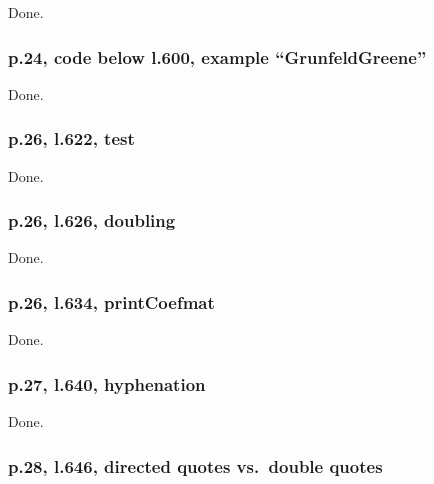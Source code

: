 \documentclass[12pt,english]{scrartcl}
\begin{document}
Done.

\subsubsection{p.24, code below l.600, example ``GrunfeldGreene''}

Done.

\subsubsection{p.26, l.622, test}

Done.

\subsubsection{p.26, l.626, doubling}

Done.

\subsubsection{p.26, l.634, printCoefmat}

Done.

\subsubsection{p.27, l.640, hyphenation}

Done.

\subsubsection{p.28, l.646, directed quotes vs.\ double quotes}
\end{document}
